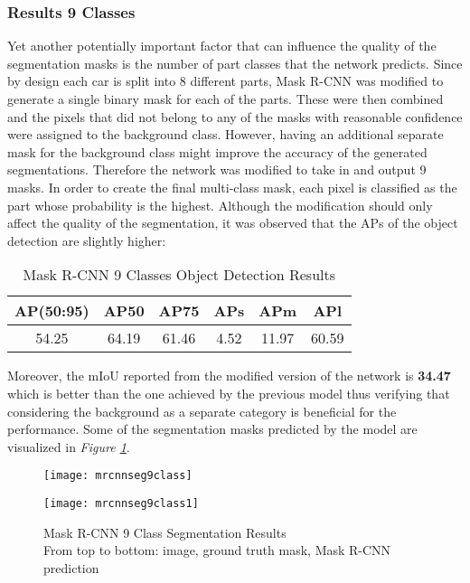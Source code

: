 \documentclass[main.tex]{subfiles}
\begin{document}
\subsubsection{Results 9 Classes}
Yet another potentially important factor that can influence the quality of the segmentation masks is the number of part classes that the network predicts. Since by design each car is split into 8 different parts, Mask R-CNN was modified to generate a single binary mask for each of the parts. These were then combined and the pixels that did not belong to any of the masks with reasonable confidence were assigned to the background class. However, having an additional separate mask for the background class might improve the accuracy of the generated segmentations. Therefore the network was modified to take in and output 9 masks. In order to create the final multi-class mask, each pixel is classified as the part whose probability is the highest. Although the modification should only affect the quality of the segmentation, it was observed that the APs of the object detection are slightly higher:
\begin{table}[H]
	\centering
	\begin{tabular}{| c | c | c | c | c | c |}
		\hline 
  		AP(50:95) & AP50 & AP75 & APs & APm & APl  \\
  		\hline
   		54.25 & 64.19 & 61.46 & 4.52 & 11.97 & 60.59 \\
		\hline
	\end{tabular}	
\caption{Mask R-CNN 9 Classes Object Detection Results}
\end{table}
\label{tab:mrcnn_obj_results9class}
Moreover, the mIoU reported from the modified version of the network is \textbf{34.47} which is better than the one achieved by the previous model thus verifying that considering the background as a separate category is beneficial for the performance. Some of the segmentation masks predicted by the model are visualized in \emph{Figure \ref{fig:mrcnn9class_masks}}.
\begin{figure}[H]
\centering
\texttt{[image: mrcnnseg9class]}
\end{figure}
\begin{figure}[h]
\centering
\texttt{[image: mrcnnseg9class1]}
\captionsetup{justification=centering}
\caption{Mask R-CNN 9 Class Segmentation Results \\ From top to bottom: image, ground truth mask, Mask R-CNN prediction}
\label{fig:mrcnn9class_masks}
\end{figure}
\end{document}
